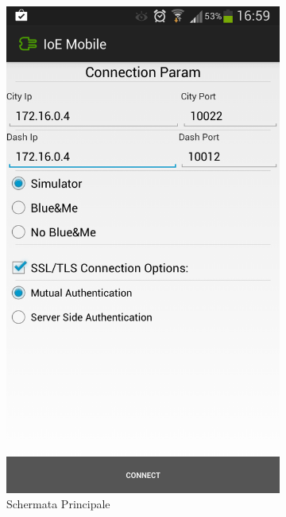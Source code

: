 \begin{figure}
	\centering
	\begin{subfigure}{0.45\textwidth}
		\includegraphics[width=\textwidth]{assets/mobile-app-main.png}
		\caption{Schermata Principale}
		\label{fig:main-activity}
	\end{subfigure}
	\begin{subfigure}{0.45\textwidth}

\end{subfigure}
\end{figure}
